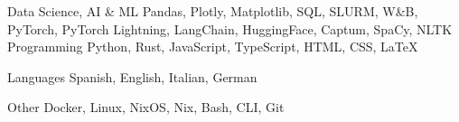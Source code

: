 

\begin{cvskills}


  \cvskill
    {Data Science, AI \& ML} %
    {Pandas, Plotly, Matplotlib, SQL, SLURM, W\&B, PyTorch, PyTorch Lightning, LangChain, HuggingFace, Captum, SpaCy, NLTK} %
  \cvskill
    {Programming} %
    {Python, Rust, JavaScript, TypeScript, HTML, CSS, LaTeX} %

  \cvskill
    {Languages} %
    {Spanish, English, Italian, German} %

  \cvskill
    {Other}
    {Docker, Linux, NixOS, Nix, Bash, CLI, Git}

\end{cvskills}
